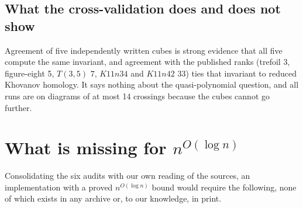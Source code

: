 \documentclass[11pt]{article}
\theoremstyle{remark}
\newcommand{\qp}{n^{O(\log n)}}
\begin{document}
\subsection{What the cross-validation does and does not show}
Agreement of five independently written cubes is strong evidence that all
five compute the same invariant, and agreement with the published ranks
(trefoil 3, figure-eight 5, $T(3,5)$ 7, $K11n34$ and $K11n42$ 33) ties that
invariant to reduced Khovanov homology. It says nothing about the
quasi-polynomial question, and all runs are on diagrams of at most 14
crossings because the cubes cannot go further.

\section{What is missing for \texorpdfstring{$\qp$}{n\^{}O(log n)}}
\label{sec:missing}
Consolidating the six audits with our own reading of the sources, an
implementation with a proved $\qp$ bound would require the following, none
of which exists in any archive or, to our knowledge, in print.
\end{document}
